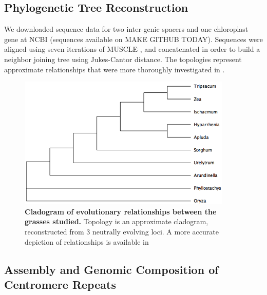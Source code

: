 \documentclass[10pt,letterpaper]{article}
\begin{document}
\subsection*{Phylogenetic Tree Reconstruction}
We downloaded sequence data for two inter-genic spacers and one chloroplast gene at NCBI (sequences available on MAKE GITHUB TODAY).
Sequences were aligned using seven iterations of MUSCLE \cite{edgar2004muscle}, and concatenated in order to build a neighbor joining tree using Jukes-Cantor distance.
The topologies represent approximate relationships that were more thoroughly investigated in \cite{wu2012phylogeny}.

\begin{figure}[h]
\begin{center}
\includegraphics[width=4in]{Phylotree_centrepeat.png}
\end{center}
\caption{{\bf Cladogram of evolutionary relationships between the grasses studied.}
Topology is an approximate cladogram, reconstructed from 3 neutrally evolving loci.
A more accurate depiction of relationships is available in \cite{wu2012phylogeny}}
\label{phylotree}
\end{figure}

\subsection*{Assembly and Genomic Composition of Centromere Repeats}

\end{document}
